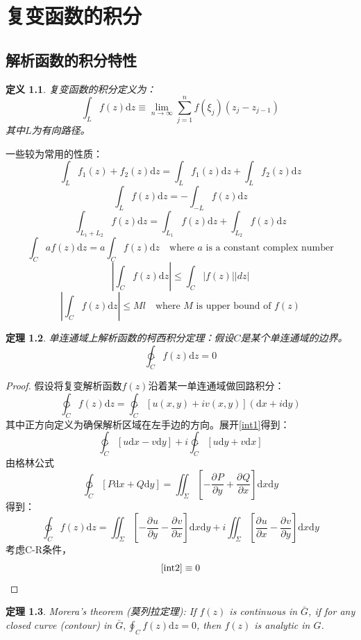 \documentclass[10pt, a4paper, oneside]{ctexbook}
\newtheorem{theorem}{定理}[section]
\newtheorem{definition}[theorem]{定义}
\def\D{\mathrm{d}}
\def\Fex{\ensuremath{u(x,y)+iv(x,y)}}
\newcommand{\partdev}[3][]
{\ensuremath{\frac{\displaystyle \partial^{#1} #2}{ \displaystyle \partial #3}}}
\newcommand{\F}[1][z]
{\ensuremath{f(#1)}}
\begin{document}
\chapter{ 复变函数的积分}

\section{解析函数的积分特性}

\begin{definition}
    复变函数的积分定义为：
    $$\int_L f(z) \D z \equiv \lim_{n\to\infty}\sum_{j=1}^n f(\xi_j)(z_j-z_{j-1})$$
    其中$L$为有向路径。
\end{definition}
一些较为常用的性质：
$$\int_L f_1(z)+f_2(z)\D z=\int_L f_1(z)\D z+\int_L f_2(z)\D z$$
$$\int_L f(z)\D z = -\int_{-L} f(z)\D z$$
$$\int_{L_1+L_2} f(z)\D z = \int_{L_1} f(z)\D z+\int_{L_2} f(z)\D z$$
$$\int_{C} a f(z) \D z=a \int_{C} f(z) \D z \quad \text{where $a$ is a constant complex number}$$ 
\begin{equation*}
\left|\int_{C} f(z) \D z\right| \leq \int_{C}|f(z)||d z|
\end{equation*}
$$\left|\int_{C} f(z) \D z\right| \leq M l \quad \text{where $M$ is upper bound of $f(z)$}$$
\begin{theorem}
    单连通域上解析函数的柯西积分定理：假设$C$是某个单连通域的边界。
    $$\ointctrclockwise_C \F \D z = 0$$
\end{theorem}
\begin{proof}
    假设将复变解析函数$\F$沿着某一单连通域做回路积分：
\begin{equation}
    \label{int1}
    \ointctrclockwise_C \F \D z = \ointctrclockwise_C \left[\Fex\right](\D x + i \D y)
\end{equation}
其中正方向定义为确保解析区域在左手边的方向。展开\ref{int1}得到：
$$\ointctrclockwise_C \left[u\D x- v\D y\right] + i \ointctrclockwise_C \left[u\D y+ v\D x\right]$$
由格林公式
$$\ointctrclockwise_C \left[P\D x+ Q\D y\right] = \iint_\Sigma \left[-\partdev{P}{y}+\partdev{Q}{x}\right]\D x\D y$$
得到：
\begin{equation}
    \label{int2}
    \ointctrclockwise_C \F \D z=  \iint_\Sigma \left[-\partdev{u}{y}-\partdev{v}{x}\right]\D x\D y+i\iint_{\Sigma} \left[\partdev{u}{x}-\partdev{v}{y}\right]\D x\D y
\end{equation}
考虑{\rm C-R}条件，
$$\ref{int2}\equiv 0$$
\end{proof}
\begin{theorem}
    Morera's theorem ({莫列拉定理}): If $f(z)$ is continuous in $\bar{G}$, if for any closed curve (contour) in $\displaystyle \bar{G}, \oint_{C} f(z) \D z=0$, then $f(z)$ is analytic in $G$.
\end{theorem}
\end{document}
